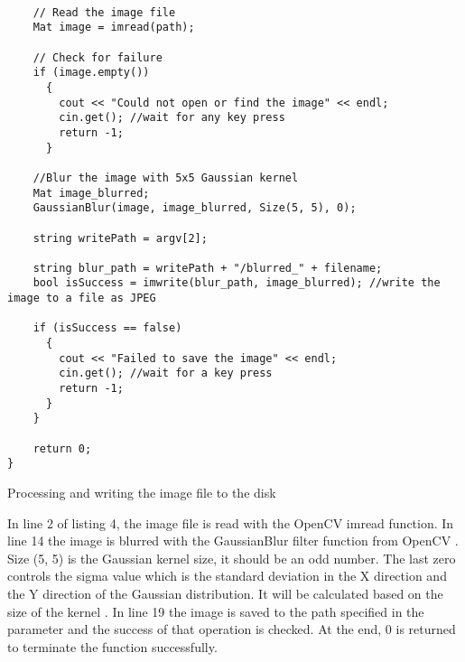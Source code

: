 \begin{listing}[ht]
\begin{verbatim}

    // Read the image file
    Mat image = imread(path);

    // Check for failure
    if (image.empty())
      {
        cout << "Could not open or find the image" << endl;
        cin.get(); //wait for any key press
        return -1;
      }

    //Blur the image with 5x5 Gaussian kernel
    Mat image_blurred;
    GaussianBlur(image, image_blurred, Size(5, 5), 0);

    string writePath = argv[2];

    string blur_path = writePath + "/blurred_" + filename;
    bool isSuccess = imwrite(blur_path, image_blurred); //write the image to a file as JPEG

    if (isSuccess == false)
      {
        cout << "Failed to save the image" << endl;
        cin.get(); //wait for a key press
        return -1;
      }
    }

    return 0;
}
\end{verbatim}
\caption{Processing and writing the image file to the disk}
\label{listing:c++-write}
\end{listing}

In line 2 of listing 4, the image file is read with the OpenCV imread function. In line 14 the image is blurred with the GaussianBlur filter function from OpenCV \cite{gaussianblur}. Size (5, 5) is the Gaussian kernel size, it should be an odd number. The last zero controls the sigma value which is the standard deviation in the X direction and the Y direction of the Gaussian distribution. It will be calculated based on the size of the kernel \cite{gaussianblurtutorial}. In line 19 the image is saved to the path specified in the parameter and the success of that operation is checked. At the end, 0 is returned to terminate the function successfully.
